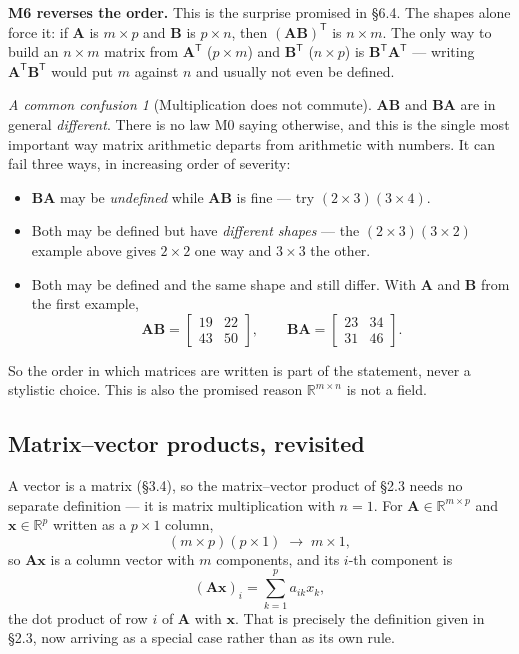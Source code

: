 \documentclass[11pt]{article}
\theoremstyle{plain}
\theoremstyle{definition}
\theoremstyle{remark}
\newtheorem*{warn}{A common confusion}
\newcommand{\R}{\mathbb{R}}
\newcommand{\vc}[1]{\mathbf{#1}}        %
\newcommand{\mt}[1]{\mathbf{#1}}        %
\newcommand{\T}{^{\mathsf{T}}}          %
\begin{document}
\medskip
\noindent\textbf{M6 reverses the order.} This is the surprise promised in \S6.4.
The shapes alone force it: if $\mt{A}$ is $m\times p$ and $\mt{B}$ is $p\times
n$, then $(\mt{A}\mt{B})\T$ is $n\times m$. The only way to build an $n\times m$
matrix from $\mt{A}\T$ ($p\times m$) and $\mt{B}\T$ ($n\times p$) is
$\mt{B}\T\mt{A}\T$ --- writing $\mt{A}\T\mt{B}\T$ would put $m$ against $n$ and
usually not even be defined.

\begin{warn}[Multiplication does not commute]
$\mt{A}\mt{B}$ and $\mt{B}\mt{A}$ are in general \emph{different}. There is no
law M0 saying otherwise, and this is the single most important way matrix
arithmetic departs from arithmetic with numbers. It can fail three ways, in
increasing order of severity:
\begin{itemize}[leftmargin=1.4em,itemsep=2pt,topsep=3pt]
  \item $\mt{B}\mt{A}$ may be \emph{undefined} while $\mt{A}\mt{B}$ is fine ---
        try $(2\times3)(3\times4)$.
  \item Both may be defined but have \emph{different shapes} --- the
        $(2\times3)(3\times2)$ example above gives $2\times2$ one way and
        $3\times3$ the other.
  \item Both may be defined and the same shape and still differ. With $\mt{A}$
        and $\mt{B}$ from the first example,
        \[
          \mt{A}\mt{B}=\begin{bmatrix}19&22\\43&50\end{bmatrix},
          \qquad
          \mt{B}\mt{A}=\begin{bmatrix}23&34\\31&46\end{bmatrix} .
        \]
\end{itemize}
So the order in which matrices are written is part of the statement, never a
stylistic choice. This is also the promised reason $\R^{m\times n}$ is not a
field.
\end{warn}

\subsection{Matrix--vector products, revisited}
A vector is a matrix (\S3.4), so the matrix--vector product of \S2.3 needs no
separate definition --- it is matrix multiplication with $n=1$. For
$\mt{A}\in\R^{m\times p}$ and $\vc{x}\in\R^{p}$ written as a $p\times1$ column,
\[
  (m\times p)(p\times 1)\;\longrightarrow\; m\times 1 ,
\]
so $\mt{A}\vc{x}$ is a column vector with $m$ components, and its $i$-th
component is
\[
  (\mt{A}\vc{x})_i=\sum_{k=1}^{p}a_{ik}x_k ,
\]
the dot product of row $i$ of $\mt{A}$ with $\vc{x}$. That is precisely the
definition given in \S2.3, now arriving as a special case rather than as its own
rule.
\end{document}
